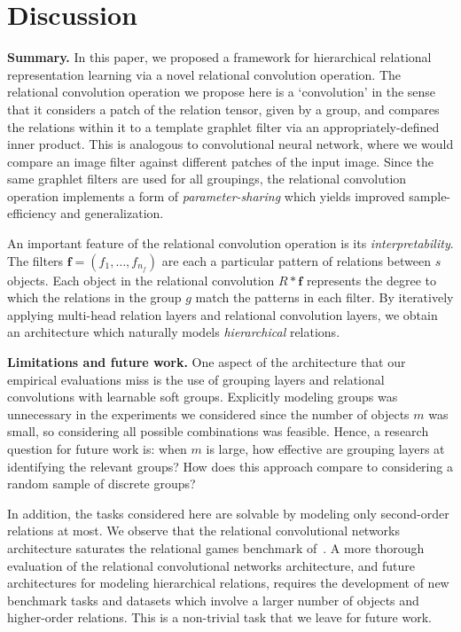
\section{Discussion}\label{sec:discussion}

\textbf{Summary.} In this paper, we proposed a framework for hierarchical relational representation learning via a novel relational convolution operation. The relational convolution operation we propose here is a `convolution' in the sense that it considers a patch of the relation tensor, given by a group, and compares the relations within it to a template graphlet filter via an appropriately-defined inner product. This is analogous to convolutional neural network, where we would compare an image filter against different patches of the input image. Since the same graphlet filters are used for all groupings, the relational convolution operation implements a form of \textit{parameter-sharing} which yields improved sample-efficiency and generalization.

An important feature of the relational convolution operation is its \textit{interpretability}. The filters $\bm{f} = (f_1, \ldots, f_{n_f})$ are each a particular pattern of relations between $s$ objects. Each object in the relational convolution $R \ast \bm{f}$ represents the degree to which the relations in the group $g$ match the patterns in each filter. By iteratively applying multi-head relation layers and relational convolution layers, we obtain an architecture which naturally models \textit{hierarchical} relations.

\textbf{Limitations and future work.} One aspect of the architecture that our empirical evaluations miss is the use of grouping layers and relational convolutions with learnable soft groups. Explicitly modeling groups was unnecessary in the experiments we considered since the number of objects $m$ was small, so considering all possible combinations was feasible. Hence, a research question for future work is: when $m$ is large, how effective are grouping layers at identifying the relevant groups? How does this approach compare to considering a random sample of discrete groups?

In addition, the tasks considered here are solvable by modeling only second-order relations at most. We observe that the relational convolutional networks architecture saturates the relational games benchmark of~\citep{shanahanExplicitlyRelationalNeural}. A more thorough evaluation of the relational convolutional networks architecture, and future architectures for modeling hierarchical relations, requires the development of new benchmark tasks and datasets which involve a larger number of objects and higher-order relations. This is a non-trivial task that we leave for future work.

